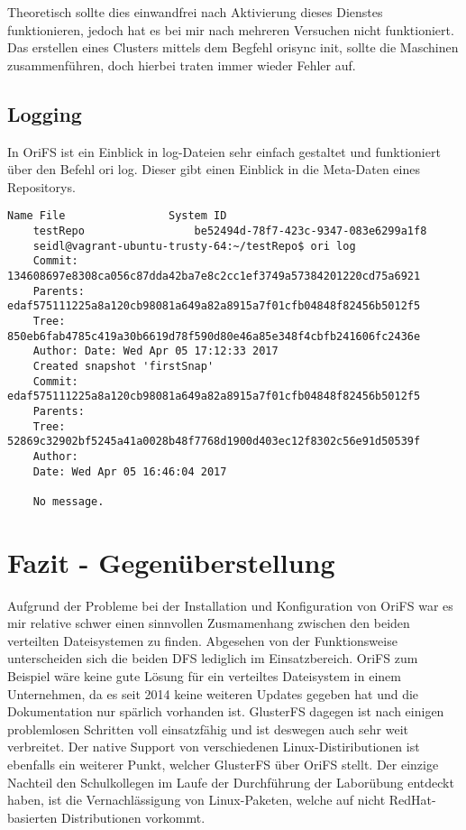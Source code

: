	Theoretisch sollte dies einwandfrei nach Aktivierung dieses Dienstes funktionieren, jedoch hat es bei mir nach mehreren Versuchen nicht funktioniert. Das erstellen eines Clusters mittels dem Begfehl orisync init, sollte die Maschinen zusammenführen, doch hierbei traten immer wieder Fehler auf.

\subsection{Logging}
	In OriFS ist ein Einblick in log-Dateien sehr einfach gestaltet und funktioniert über den Befehl ori log. Dieser gibt einen Einblick in die Meta-Daten eines Repositorys.
	\begin{lstlisting}[style=Java, caption=ori log]
	Name File				 System ID
	testRepo				 be52494d-78f7-423c-9347-083e6299a1f8
	seidl@vagrant-ubuntu-trusty-64:~/testRepo$ ori log
	Commit: 	134608697e8308ca056c87dda42ba7e8c2cc1ef3749a57384201220cd75a6921
	Parents: 	edaf575111225a8a120cb98081a649a82a8915a7f01cfb04848f82456b5012f5
	Tree: 		850eb6fab4785c419a30b6619d78f590d80e46a85e348f4cbfb241606fc2436e
	Author: Date: Wed Apr 05 17:12:33 2017
	Created snapshot 'firstSnap'
	Commit: 	edaf575111225a8a120cb98081a649a82a8915a7f01cfb04848f82456b5012f5
	Parents: 
	Tree: 		52869c32902bf5245a41a0028b48f7768d1900d403ec12f8302c56e91d50539f
	Author: 
	Date: Wed Apr 05 16:46:04 2017
	
	No message.
	\end{lstlisting}
	
\section{Fazit - Gegenüberstellung}
	Aufgrund der Probleme bei der Installation und Konfiguration von OriFS war es mir relative schwer einen sinnvollen Zusmamenhang zwischen den beiden verteilten Dateisystemen zu finden. Abgesehen von der Funktionsweise unterscheiden sich die beiden DFS lediglich im Einsatzbereich. OriFS zum Beispiel wäre keine gute Lösung für ein verteiltes Dateisystem in einem Unternehmen, da es seit 2014 keine weiteren Updates gegeben hat und die Dokumentation nur spärlich vorhanden ist.
	GlusterFS dagegen ist nach einigen problemlosen Schritten voll einsatzfähig und ist deswegen auch sehr weit verbreitet. Der native Support von verschiedenen Linux-Distiributionen ist ebenfalls ein weiterer Punkt, welcher GlusterFS über OriFS stellt. Der einzige Nachteil den Schulkollegen im Laufe der Durchführung der Laborübung entdeckt haben, ist die Vernachlässigung von Linux-Paketen, welche auf nicht RedHat-basierten Distributionen vorkommt.